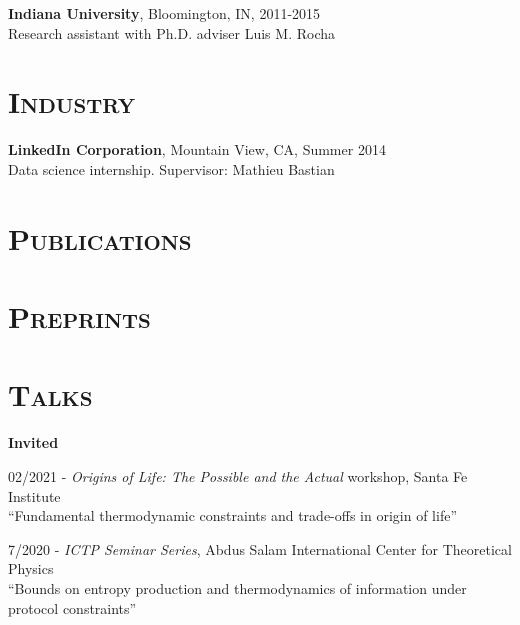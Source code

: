 \documentclass[margin,line,centered]{res}
\begin{document}
\begin{resume}
\textbf{Indiana University}, Bloomington, IN, 2011-2015\\
Research assistant with Ph.D. adviser Luis M. Rocha 

\section{\textsc{Industry}}

\textbf{LinkedIn Corporation}, Mountain View, CA, Summer 2014\\
Data science internship. Supervisor: Mathieu Bastian

\section{\textsc{Publications}}


\section{\textsc{Preprints}}


\section{\textsc{Talks}}

\textbf{Invited}

02/2021 - \emph{Origins of Life: The Possible and the Actual} workshop, Santa Fe Institute\\
``Fundamental thermodynamic constraints and trade-offs in origin of life'' %


7/2020 - \emph{ICTP Seminar Series}, Abdus Salam International Center for Theoretical Physics\\
``Bounds on entropy production and thermodynamics of information under protocol constraints'' %



\end{resume}
\end{document}
